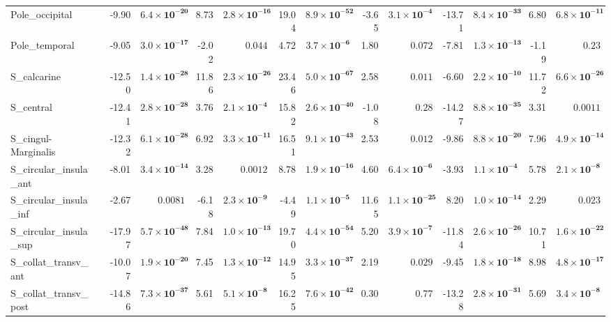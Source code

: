 {\begin{longtable}{llrrrrrrrrrrrr}
Pole\_occipital &  & -9.90 & $\mathbf{6.4{\times}10^{-20}}$ & 8.73 & $\mathbf{2.8{\times}10^{-16}}$ & 19.04 & $\mathbf{8.9{\times}10^{-52}}$ & -3.65 & $\mathbf{3.1{\times}10^{-4}}$ & -13.71 & $\mathbf{8.4{\times}10^{-33}}$ & 6.80 & $\mathbf{6.8{\times}10^{-11}}$ \\
Pole\_temporal &  & -9.05 & $\mathbf{3.0{\times}10^{-17}}$ & -2.02 & $0.044$ & 4.72 & $\mathbf{3.7{\times}10^{-6}}$ & 1.80 & $0.072$ & -7.81 & $\mathbf{1.3{\times}10^{-13}}$ & -1.19 & $0.23$ \\
S\_calcarine &  & -12.50 & $\mathbf{1.4{\times}10^{-28}}$ & 11.86 & $\mathbf{2.3{\times}10^{-26}}$ & 23.46 & $\mathbf{5.0{\times}10^{-67}}$ & 2.58 & $0.011$ & -6.60 & $\mathbf{2.2{\times}10^{-10}}$ & 11.72 & $\mathbf{6.6{\times}10^{-26}}$ \\
S\_central &  & -12.41 & $\mathbf{2.8{\times}10^{-28}}$ & 3.76 & $\mathbf{2.1{\times}10^{-4}}$ & 15.82 & $\mathbf{2.6{\times}10^{-40}}$ & -1.08 & $0.28$ & -14.27 & $\mathbf{8.8{\times}10^{-35}}$ & 3.31 & $0.0011$ \\
S\_cingul-Marginalis &  & -12.32 & $\mathbf{6.1{\times}10^{-28}}$ & 6.92 & $\mathbf{3.3{\times}10^{-11}}$ & 16.51 & $\mathbf{9.1{\times}10^{-43}}$ & 2.53 & $0.012$ & -9.86 & $\mathbf{8.8{\times}10^{-20}}$ & 7.96 & $\mathbf{4.9{\times}10^{-14}}$ \\
S\_circular\_insula\_ant &  & -8.01 & $\mathbf{3.4{\times}10^{-14}}$ & 3.28 & $0.0012$ & 8.78 & $\mathbf{1.9{\times}10^{-16}}$ & 4.60 & $\mathbf{6.4{\times}10^{-6}}$ & -3.93 & $\mathbf{1.1{\times}10^{-4}}$ & 5.78 & $\mathbf{2.1{\times}10^{-8}}$ \\
S\_circular\_insula\_inf &  & -2.67 & $0.0081$ & -6.18 & $\mathbf{2.3{\times}10^{-9}}$ & -4.49 & $\mathbf{1.1{\times}10^{-5}}$ & 11.65 & $\mathbf{1.1{\times}10^{-25}}$ & 8.20 & $\mathbf{1.0{\times}10^{-14}}$ & 2.29 & $0.023$ \\
S\_circular\_insula\_sup &  & -17.97 & $\mathbf{5.7{\times}10^{-48}}$ & 7.84 & $\mathbf{1.0{\times}10^{-13}}$ & 19.70 & $\mathbf{4.4{\times}10^{-54}}$ & 5.20 & $\mathbf{3.9{\times}10^{-7}}$ & -11.84 & $\mathbf{2.6{\times}10^{-26}}$ & 10.71 & $\mathbf{1.6{\times}10^{-22}}$ \\
S\_collat\_transv\_ant &  & -10.07 & $\mathbf{1.9{\times}10^{-20}}$ & 7.45 & $\mathbf{1.3{\times}10^{-12}}$ & 14.95 & $\mathbf{3.3{\times}10^{-37}}$ & 2.19 & $0.029$ & -9.45 & $\mathbf{1.8{\times}10^{-18}}$ & 8.98 & $\mathbf{4.8{\times}10^{-17}}$ \\
S\_collat\_transv\_post &  & -14.86 & $\mathbf{7.3{\times}10^{-37}}$ & 5.61 & $\mathbf{5.1{\times}10^{-8}}$ & 16.25 & $\mathbf{7.6{\times}10^{-42}}$ & 0.30 & $0.77$ & -13.28 & $\mathbf{2.8{\times}10^{-31}}$ & 5.69 & $\mathbf{3.4{\times}10^{-8}}$ \\

\end{longtable}}

